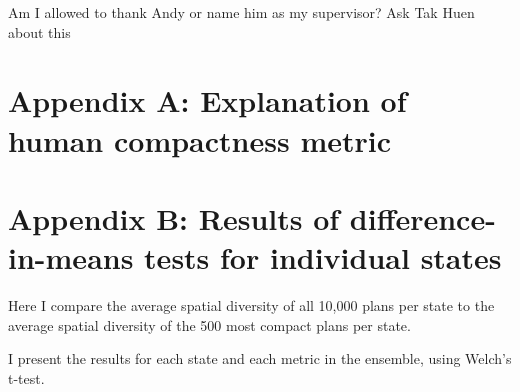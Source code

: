 \documentclass[]{article}
\begin{document}
Am I allowed to thank Andy or name him as my supervisor? Ask Tak Huen
about this

\hypertarget{appendix-a-explanation-of-human-compactness-metric}{%
\section{Appendix A: Explanation of human compactness
metric}\label{appendix-a-explanation-of-human-compactness-metric}}

\hypertarget{appendix-b-results-of-difference-in-means-tests-for-individual-states}{%
\section{Appendix B: Results of difference-in-means tests for individual
states}\label{appendix-b-results-of-difference-in-means-tests-for-individual-states}}

Here I compare the average spatial diversity of all 10,000 plans per
state to the average spatial diversity of the 500 most compact plans per
state.

I present the results for each state and each metric in the ensemble,
using Welch's t-test.
\end{document}
